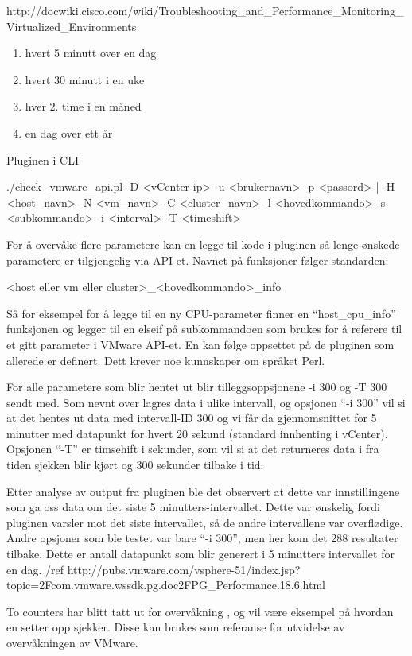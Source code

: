 http://docwiki.cisco.com/wiki/Troubleshooting\_and\_Performance\_Monitoring\_Virtualized\_Environments

\begin{enumerate}
	\item hvert 5 minutt over en dag 
	\item hvert 30 minutt i en uke
	\item hver 2. time i en måned
	\item en dag over ett år
\end{enumerate}

Pluginen i CLI

./check\_vmware\_api.pl -D <vCenter ip> -u <brukernavn> -p <passord> | -H <host\_navn> -N <vm\_navn> -C <cluster\_navn>  -l <hovedkommando> -s <subkommando> -i <interval> -T <timeshift>

For å overvåke flere parametere kan en legge til kode i pluginen så lenge ønskede parametere er tilgjengelig via API-et. Navnet på funksjoner følger standarden:

<host eller vm eller cluster>\_<hovedkommando>\_info 

Så for eksempel for å legge til en ny CPU-parameter finner en “host\_cpu\_info” funksjonen og legger til en elseif på subkommandoen som brukes for å referere til et gitt parameter i VMware API-et. En kan følge oppsettet på de pluginen som allerede er definert. Dett krever noe kunnskaper om språket Perl.

For alle parametere som blir hentet ut blir tilleggsoppsjonene -i 300 og -T 300 sendt med.
Som nevnt over lagres data i ulike intervall, og opsjonen “-i 300” vil si at det hentes ut data med intervall-ID 300 og vi får da gjennomsnittet for 5 minutter med datapunkt for hvert 20 sekund (standard innhenting i vCenter). Opsjonen “-T” er timsehift i sekunder, som vil si at det returneres data i fra tiden sjekken blir kjørt og 300 sekunder tilbake i tid. 

Etter analyse av output fra pluginen ble det observert at dette var innstillingene som ga oss data om det siste 5 minutters-intervallet. Dette var ønskelig fordi pluginen varsler mot det siste intervallet, så de andre intervallene var overflødige. Andre opsjoner som ble testet var bare “-i 300”, men her kom det 288 resultater tilbake. Dette er antall datapunkt som blir generert i 5 minutters intervallet for en dag. /ref http://pubs.vmware.com/vsphere-51/index.jsp?topic=2Fcom.vmware.wssdk.pg.doc2FPG\_Performance.18.6.html

To counters har blitt tatt ut for overvåkning , og vil være eksempel på hvordan en setter opp sjekker. Disse kan brukes som referanse for utvidelse av overvåkningen av VMware. 

